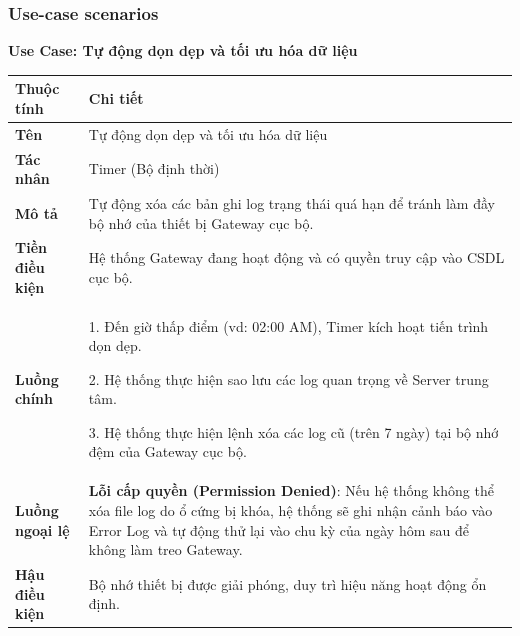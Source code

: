 \subsubsection{Use-case scenarios}

\noindent \textbf{Use Case: Tự động dọn dẹp và tối ưu hóa dữ liệu} \\
\renewcommand{\arraystretch}{1.6}
\begin{xltabular}{\textwidth}{|l|X|}
\hline
\textbf{Thuộc tính} & \textbf{Chi tiết} \\
\hline
\textbf{Tên} & Tự động dọn dẹp và tối ưu hóa dữ liệu \\
\hline
\textbf{Tác nhân} & Timer (Bộ định thời) \\
\hline
\textbf{Mô tả} & Tự động xóa các bản ghi log trạng thái quá hạn để tránh làm đầy bộ nhớ của thiết bị Gateway cục bộ. \\
\hline
\textbf{Tiền điều kiện} & Hệ thống Gateway đang hoạt động và có quyền truy cập vào CSDL cục bộ. \\
\hline
\textbf{Luồng chính} & 
1. Đến giờ thấp điểm (vd: 02:00 AM), Timer kích hoạt tiến trình dọn dẹp.

2. Hệ thống thực hiện sao lưu các log quan trọng về Server trung tâm.

3. Hệ thống thực hiện lệnh xóa các log cũ (trên 7 ngày) tại bộ nhớ đệm của Gateway cục bộ.
\\
\hline

\textbf{Luồng ngoại lệ} & 
\textbf{Lỗi cấp quyền (Permission Denied)}: Nếu hệ thống không thể xóa file log do ổ cứng bị khóa, hệ thống sẽ ghi nhận cảnh báo vào Error Log và tự động thử lại vào chu kỳ của ngày hôm sau để không làm treo Gateway.
\\
\hline

\textbf{Hậu điều kiện} & Bộ nhớ thiết bị được giải phóng, duy trì hiệu năng hoạt động ổn định.\\
\hline
\end{xltabular}


